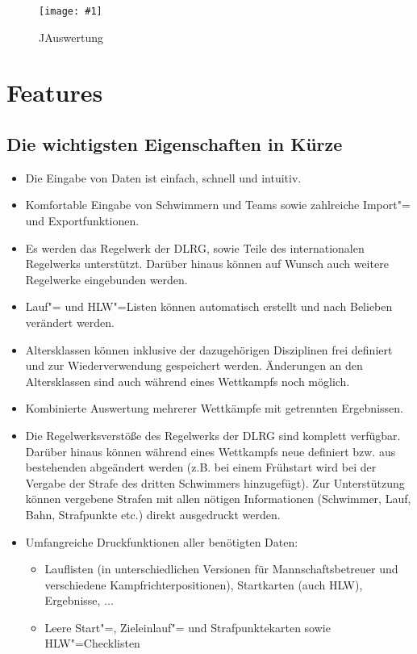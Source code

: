 \documentclass[11pt,a4paper,twoside,ngerman]{article}
\newcommand{\hsmimage}[3]{\begin{figure}[!ht]\centering\texttt{[image: \#1]}\caption{#3}\end{figure}}
\begin{document}
\hsmimage{pics/jauswertung}{.80\textwidth}{JAuswertung}

\newpage

\section{Features}

\subsection*{Die wichtigsten Eigenschaften in Kürze}

\begin{itemize}

\item Die Eingabe von Daten ist einfach, schnell und intuitiv.


\item Komfortable Eingabe von Schwimmern und Teams sowie zahlreiche Import"= und Exportfunktionen.


\item Es werden das Regelwerk der DLRG, sowie Teile des internationalen Regelwerks unterstützt. Darüber hinaus können auf Wunsch auch weitere Regelwerke eingebunden werden.


\item Lauf"= und HLW"=Listen können automatisch erstellt und nach Belieben verändert werden.


\item Altersklassen können inklusive der dazugehörigen Disziplinen frei definiert und zur Wiederverwendung gespeichert werden. Änderungen an den Altersklassen sind auch während eines Wettkampfs noch möglich.


\item Kombinierte Auswertung mehrerer Wettkämpfe mit getrennten Ergebnissen.


\item Die Regelwerksverstöße des  Regelwerks der DLRG sind komplett verfügbar. Darüber hinaus können während eines Wettkampfs neue definiert bzw. aus bestehenden abgeändert werden (z.B. bei einem Frühstart wird bei der Vergabe der Strafe \glqq{}des dritten Schwimmers\grqq{} hinzugefügt). Zur Unterstützung können vergebene Strafen mit allen nötigen Informationen (Schwimmer, Lauf, Bahn, Strafpunkte etc.) direkt ausgedruckt werden.


\item Umfangreiche Druckfunktionen aller benötigten Daten:
\begin{itemize}

\item Lauflisten (in unterschiedlichen Versionen für Mannschaftsbetreuer und verschiedene Kampfrichterpositionen), Startkarten (auch HLW), Ergebnisse, ...


\item Leere Start"=, Zieleinlauf"= und Strafpunktekarten sowie HLW"=Checklisten


\end{itemize}



\end{itemize}
\end{document}
